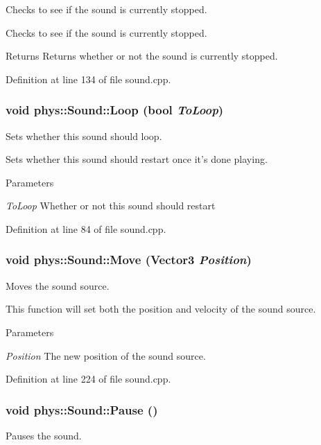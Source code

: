 Checks to see if the sound is currently stopped. 

Checks to see if the sound is currently stopped. \begin{DoxyReturn}{Returns}
Returns whether or not the sound is currently stopped. 
\end{DoxyReturn}


Definition at line 134 of file sound.cpp.

\hypertarget{classphys_1_1Sound_afd5645195ac744de62c5eefc01dbf0d0}{
\subsubsection[{Loop}]{\setlength{\rightskip}{0pt plus 5cm}void phys::Sound::Loop (bool {\em ToLoop})}}
\label{dc/d2f/classphys_1_1Sound_afd5645195ac744de62c5eefc01dbf0d0}


Sets whether this sound should loop. 

Sets whether this sound should restart once it's done playing. 
\begin{DoxyParams}{Parameters}
\item[{\em ToLoop}]Whether or not this sound should restart \end{DoxyParams}


Definition at line 84 of file sound.cpp.

\hypertarget{classphys_1_1Sound_a62075a732f25c0a07b428c09c6232814}{
\subsubsection[{Move}]{\setlength{\rightskip}{0pt plus 5cm}void phys::Sound::Move ({\bf Vector3} {\em Position})}}
\label{dc/d2f/classphys_1_1Sound_a62075a732f25c0a07b428c09c6232814}


Moves the sound source. 

This function will set both the position and velocity of the sound source. 
\begin{DoxyParams}{Parameters}
\item[{\em Position}]The new position of the sound source. \end{DoxyParams}


Definition at line 224 of file sound.cpp.

\hypertarget{classphys_1_1Sound_a805bef416bec70b5e250dd29e622cf46}{
\subsubsection[{Pause}]{\setlength{\rightskip}{0pt plus 5cm}void phys::Sound::Pause ()}}
\label{dc/d2f/classphys_1_1Sound_a805bef416bec70b5e250dd29e622cf46}
Pauses the sound. 

